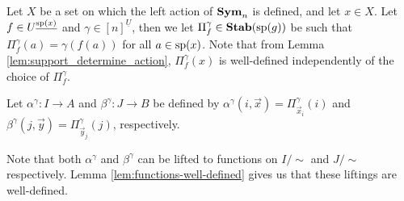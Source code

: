 \documentclass[../paper.tex]{subfiles}
\begin{document}




Let $X$ be a set on which the left action of $\text{\textbf{Sym}}_n$ is defined, and let $x \in
X$. Let $f \in U^{\underline{\text{sp}(x)}}$ and $\gamma\in [n]^{\underline{U}}$,
then we let $\Pi^{\gamma}_{f} \in \text{\textbf{Stab}} (\text{sp} (g))$ be such that $\Pi^{\gamma}_f (a) =
\gamma (f(a))$ for all $a \in \text{sp}(x)$. Note that from Lemma
\ref{lem:support_determine_action}, $\Pi^{\gamma}_f(x)$ is well-defined
independently of the choice of $\Pi^{\gamma}_f$.

Let $\alpha^{\gamma}: I \rightarrow A$ and $\beta^{\gamma}: J \rightarrow B$ be
defined by $\alpha^{\gamma} (i, \vec{x}) = \Pi^{\gamma}_{\vec{x}_{i}}(i)$ and
$\beta^{\gamma} (j, \vec{y}) = \Pi^{\gamma}_{\vec{y}_{j}}(j)$, respectively.

Note that both $\alpha^{\gamma}$ and $\beta^{\gamma}$ can be lifted to functions
on $I /{\sim}$ and $J /{\sim}$ respectively. Lemma
\ref{lem:functions-well-defined} gives us that these liftings are well-defined.
\end{document}

